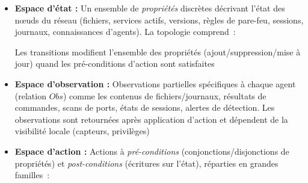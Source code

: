 \begin{itemize}
  \item \textbf{Espace d'état :} Un ensemble de \emph{propriétés} discrètes décrivant l'état des nœuds du réseau (fichiers, services actifs, versions, règles de pare-feu, sessions, journaux, connaissances d'agents). La topologie comprend~:
        Les transitions modifient l'ensemble des propriétés (ajout/suppression/mise à jour) quand les pré-conditions d'action sont satisfaites
  \item \textbf{Espace d'observation :} Observations partielles spécifiques à chaque agent (relation $Obs$) comme les contenus de fichiers/journaux, résultats de commandes, scans de ports, états de sessions, alertes de détection. Les observations sont retournées après application d'action et dépendent de la visibilité locale (capteurs, privilèges)
  \item \textbf{Espace d'action :} Actions à \emph{pré-conditions} (conjonctions/disjonctions de propriétés) et \emph{post-conditions} (écritures sur l'état), réparties en grandes familles~:
\end{itemize}
